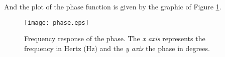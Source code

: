 And the plot of the phase function is given by the graphic of Figure \ref{fig:sim_phase}.

\begin{figure}[H] \centering
	\texttt{[image: phase.eps]}
	\caption {Frequency response of the phase. The \textit{x axis} represents the frequency in Hertz (Hz) and the \textit{y axis} the phase in degrees.}
	\label{fig:sim_phase}
\end{figure}


